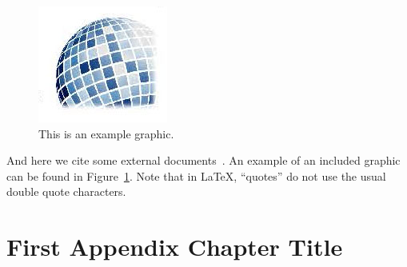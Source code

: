 \documentclass[a4paper, oneside]{discothesis}
\begin{document}
\begin{figure}
    \centering
    \includegraphics[width=0.2\columnwidth]{figures/disco_logo_faded}
    \caption{This is an example graphic.}
    \label{fig:example_figure}
\end{figure}

And here we cite some external documents~\cite{TestReference, TestReference2}.
An example of an included graphic can be found in Figure~\ref{fig:example_figure}.
Note that in \LaTeX, ``quotes'' do not use the usual double quote characters.




\appendix
\chapter{First Appendix Chapter Title}
\end{document}
